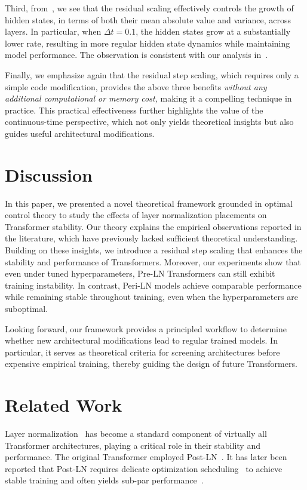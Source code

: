 \documentclass[journal]{IEEEtran}
\theoremstyle{plain}
\theoremstyle{definition}
\theoremstyle{remark}
\begin{document}
Third, from~, we see that the residual scaling effectively controls the growth of hidden states, in terms of both their mean absolute value and variance, across layers. In particular, when $\Delta t = 0.1$, the hidden states grow at a substantially lower rate, resulting in more regular hidden state dynamics while maintaining model performance.
The observation is consistent with our analysis in~.

Finally, we emphasize again that the residual step scaling, which requires only a simple code modification, provides the above three benefits \emph{without any additional computational or memory cost,} making it a compelling technique in practice. This practical effectiveness further highlights the value of the continuous-time perspective, which not only yields theoretical insights but also guides useful architectural modifications.

\section{Discussion}
In this paper, we presented a novel theoretical framework grounded in optimal control theory to study the effects of layer normalization placements on Transformer stability. Our theory explains the empirical observations reported in the literature, which have previously lacked sufficient theoretical understanding. Building on these insights, we introduce a residual step scaling that enhances the stability and performance of Transformers. Moreover, our experiments show that even under tuned hyperparameters, Pre-LN Transformers can still exhibit training instability. In contrast, Peri-LN models achieve comparable performance while remaining stable throughout training, even when the hyperparameters are suboptimal. 

Looking forward, our framework provides a principled workflow to determine whether new architectural modifications lead to regular trained models. In particular, it serves as theoretical criteria for screening architectures before expensive empirical training, thereby guiding the design of future Transformers.


\ifCLASSOPTIONcaptionsoff
  \newpage
\fi







\newpage
\onecolumn

\appendices
\section{Related Work}\label{sec:related_work}
Layer normalization~\cite{ba2016layernormalization} has become a standard component of virtually all Transformer architectures, playing a critical role in their stability and performance. The original Transformer employed Post-LN~\cite{Wang2019LearningDT}. It has later been reported that Post-LN requires delicate optimization scheduling~\cite{Popel2018TrainingTF,liu2019variance} to achieve stable training and often yields sub-par performance~\cite{xiong2020layer,kim2025peri}.
\end{document}
